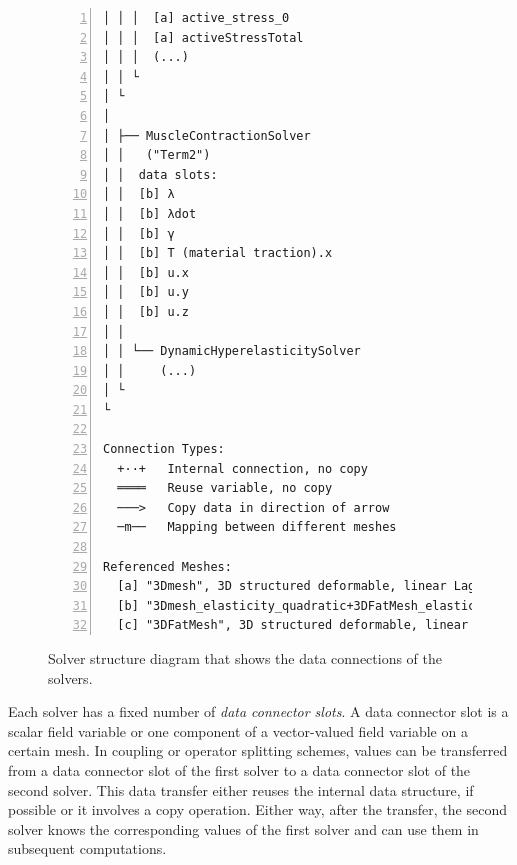 \begin{figure}
\begin{framed}
\begin{Verbatim}[fontsize=\scriptsize\ttfamily,numbers=left]
│ │ │  [a] active_stress_0                          ├÷÷÷÷÷÷÷÷─ g_mu ¤2<──┘     │ │
│ │ │  [a] activeStressTotal                         ├÷÷÷÷÷÷÷ g_tot ¤3  x      │ │
│ │ │  (...)                                          :::::::                  m │
│ │ └                                                 :::::::                  │ │
│ └                                                   :::::::                  │ │
│                                                     :::::::                  │ │
│ ├── MuscleContractionSolver                         :::::::                  │ │ 
│ │   ("Term2")                                       :::::::                  │ │
│ │  data slots:                                      :::::::                  │ │
│ │  [b] λ                                            ├÷÷÷÷÷÷lambda ¤0<────────┼─┘
│ │  [b] λdot                                          ├÷÷÷÷÷─ ldot ¤1  x      │
│ │  [b] γ                                              ├÷÷÷÷─ g_in ¤2<────────┘
│ │  [b] T (material traction).x                         ├÷÷÷──── T ¤3  x
│ │  [b] u.x                                              ├÷÷────── ¤4  x
│ │  [b] u.y                                               ├÷────── ¤5  x
│ │  [b] u.z                                                ├────── ¤6  x
│ │                                                                     
│ │ └── DynamicHyperelasticitySolver    
│ │     (...)                                
│ └                                                                     
└                                                                       
                                                                        
Connection Types:
  +··+   Internal connection, no copy
  ════   Reuse variable, no copy
  ───>   Copy data in direction of arrow
  ─m──   Mapping between different meshes

Referenced Meshes:
  [a] "3Dmesh", 3D structured deformable, linear Lagrange basis
  [b] "3Dmesh_elasticity_quadratic+3DFatMesh_elasticity_quadratic", 3D quadratic Lagrange basis
  [c] "3DFatMesh", 3D structured deformable, linear Lagrange basis
\end{Verbatim}
\vspace{-5mm}
\end{framed}
\caption{Solver structure diagram that shows the data connections of the solvers.}%
\label{fig:example_multidomain_solver_structure}%
\end{figure}

Each solver has a fixed number of \emph{data connector slots}. A data connector slot is a scalar field variable or one component of a vector-valued field variable on a certain mesh. In coupling or operator splitting schemes, values can be transferred from a data connector slot of the first solver to a data connector slot of the second solver. This data transfer either reuses the internal data structure, if possible or it involves a copy operation. Either way, after the transfer, the second solver knows the corresponding values of the first solver and can use them in subsequent computations.

